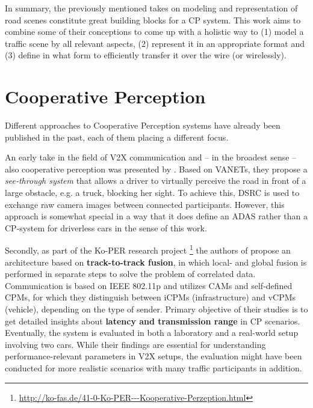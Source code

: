 In summary, the previously mentioned takes on modeling and representation of road scenes constitute great building blocks for a CP system. This work aims to combine some of their conceptions to come up with a holistic way to (1) model a traffic scene by all relevant aspects, (2) represent it in an appropriate format and (3) define in what form to efficiently transfer it over the wire (or wirelessly). 

\section{Cooperative Perception}
\label{sec:related_work:cooperative_perception}
Different approaches to Cooperative Perception systems have already been published in the past, each of them placing a different focus.
\par
\bigskip

An early take in the field of V2X communication and – in the broadest sense – also cooperative perception was presented by \cite{Olaverri-Monreal2010}. Based on VANETs, they propose a \textit{see-through system} that allows a driver to virtually perceive the road in front of a large obstacle, e.g. a truck, blocking her sight. To achieve this, DSRC is used to exchange raw camera images between connected participants. However, this approach is somewhat special in a way that it does define an ADAS rather than a CP-system for driverless cars in the sense of this work.
\par
\bigskip

Secondly, as part of the Ko-PER research project \footnote{\url{http://ko-fas.de/41-0-Ko-PER---Kooperative-Perzeption.html}} the authors of \cite{Rauch2011} propose an architecture based on \textbf{track-to-track fusion}, in which local- and global fusion is performed in separate steps to solve the problem of correlated data. Communication is based on IEEE 802.11p and utilizes CAMs and self-defined CPMs, for which they distinguish between iCPMs (infrastructure) and vCPMs (vehicle), depending on the type of sender. Primary objective of their studies is to get detailed insights about \textbf{latency and transmission range} in CP scenarios. Eventually, the system is evaluated in both a laboratory and a real-world setup involving two cars. While their findings are essential for understanding performance-relevant parameters in V2X setups, the evaluation might have been conducted for more realistic scenarios with many traffic participants in addition.
\par
\bigskip

